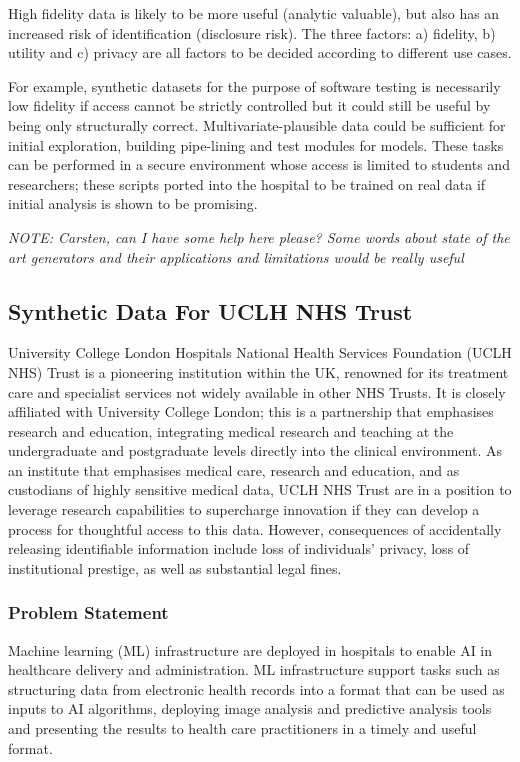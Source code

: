\documentclass[11pt]{article}
\begin{document}
High fidelity data is likely to be more useful (analytic valuable), but also has an increased risk of identification (disclosure risk). The three factors: a) fidelity, b) utility and c) privacy are all factors to be decided according to different use cases. 

For example, synthetic datasets for the purpose of software testing is necessarily low fidelity if access cannot be strictly controlled but it could still be useful by being only structurally correct.  Multivariate-plausible data could be sufficient for initial exploration, building pipe-lining and test modules for models. These tasks can be performed in a secure environment whose access is limited to students and researchers; these scripts ported into the hospital to be trained on real data if initial analysis is shown to be promising.

\textit{NOTE: Carsten, can I have some help here please? Some words about state of the art generators and their applications and limitations would be really useful}

\subsection{Synthetic Data For UCLH NHS Trust}

University College London Hospitals National Health Services Foundation (UCLH NHS) Trust  is a pioneering institution within the UK, renowned for its treatment care and specialist services not widely available in other NHS Trusts. It is closely affiliated with University College London; this is a partnership that emphasises research and education, integrating medical research and teaching at the undergraduate and postgraduate levels directly into the clinical environment. 
As an institute that emphasises medical care, research and education, and as custodians of highly sensitive medical data, UCLH NHS Trust are in a position to leverage research capabilities to supercharge innovation if they can develop a process for thoughtful access to this data. 
However, consequences of accidentally releasing identifiable information include loss of individuals' privacy, loss of institutional prestige, as well as substantial legal fines.

\subsubsection{Problem Statement}

Machine learning (ML) infrastructure are deployed in hospitals to enable AI in healthcare delivery and administration. ML infrastructure support tasks such as structuring data from electronic health records into a format that can be used as inputs to AI algorithms, deploying image analysis and predictive analysis tools and presenting the results to health care practitioners in a timely and useful format.
\end{document}
